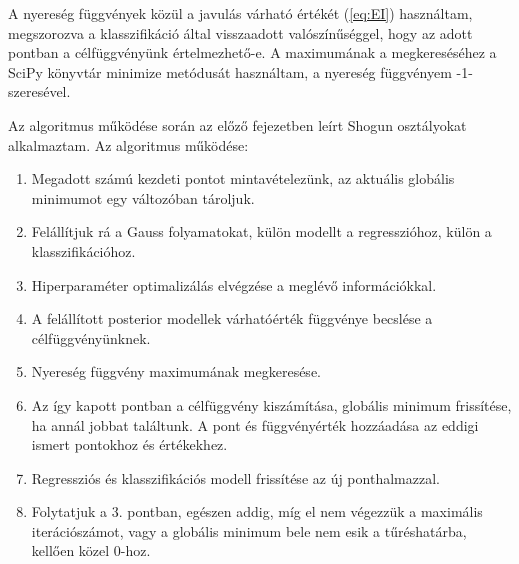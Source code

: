A nyereség függvények közül a javulás várható értékét (\ref{eq:EI}) használtam, megszorozva a klasszifikáció által visszaadott valószínűséggel, hogy az adott pontban a célfüggvényünk értelmezhető-e. A maximumának a megkereséséhez a SciPy könyvtár minimize metódusát használtam, a nyereség függvényem -1-szeresével.

Az algoritmus működése során az előző fejezetben leírt Shogun osztályokat alkalmaztam. Az algoritmus működése:

\begin{enumerate}
	\item Megadott számú kezdeti pontot mintavételezünk, az aktuális globális minimumot egy változóban tároljuk.
	\item Felállítjuk rá a Gauss folyamatokat, külön modellt a regresszióhoz, külön a klasszifikációhoz.
	\item Hiperparaméter optimalizálás elvégzése a meglévő információkkal.
	\item A felállított posterior modellek várhatóérték függvénye becslése a célfüggvényünknek.
	\item Nyereség függvény maximumának megkeresése.
	\item Az így kapott pontban a célfüggvény kiszámítása, globális minimum frissítése, ha annál jobbat találtunk. A pont és függvényérték hozzáadása az eddigi ismert pontokhoz és értékekhez. 
	\item Regressziós és klasszifikációs modell frissítése az új ponthalmazzal.
	\item Folytatjuk a 3. pontban, egészen addig, míg el nem végezzük a maximális iterációszámot, vagy a globális minimum bele nem esik a tűréshatárba, kellően közel 0-hoz.
\end{enumerate}











